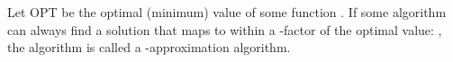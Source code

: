 
Let OPT be the optimal (minimum) value of some function . 
If some algorithm  can always find a solution that maps to within a \ilmath{\rho}-factor of the optimal value: , the algorithm is called a \ilmath{\rho}-approximation algorithm. 
